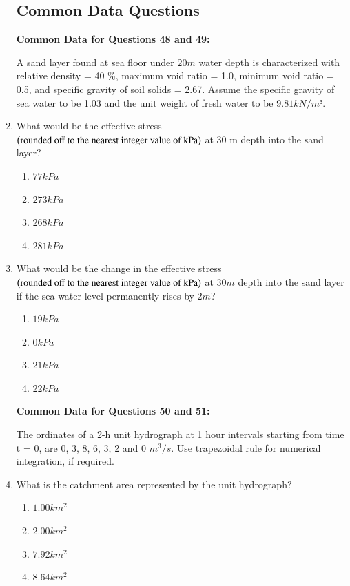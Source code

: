 \documentclass[journal,12pt,onecolumn]{IEEEtran}
\theoremstyle{remark}
\begin{document}
\begin{enumerate}
\subsection*{Common Data Questions}
\textbf{Common Data for Questions 48 and 49:}

A sand layer found at sea floor under $20 m$ water depth is characterized with relative density = 40 \%, maximum void ratio = 1.0, minimum void ratio = 0.5, and specific gravity of soil solids = 2.67. Assume the specific gravity of sea water to be 1.03 and the unit weight of fresh water to be $9.81 kN/m³$.

\item What would be the effective stress $\left(\text{rounded off to the nearest integer value of kPa}\right)$ at 30 m depth into the sand layer?

\hfill{}
\begin{enumerate}
\item $77kPa$
\item $273kPa$
\item $268kPa$
\item $281kPa$
\end{enumerate}

\item What would be the change in the effective stress $\left(\text{rounded off to the nearest integer value of kPa}\right)$ at $30 m$ depth into the sand layer if the sea water level permanently rises by $2 m$?

\hfill{}
\begin{enumerate}
\item $19kPa$
\item $0kPa$
\item $21kPa$
\item $22kPa$
\end{enumerate}

\textbf{Common Data for Questions 50 and 51:}

The ordinates of a 2-h unit hydrograph at 1 hour intervals starting from time t = 0, are 0, 3, 8, 6, 3, 2 and 0 $m^3/s$. Use trapezoidal rule for numerical integration, if required.

\item What is the catchment area represented by the unit hydrograph?

\hfill{}
\begin{enumerate}
\item $1.00km^2$
\item $2.00km^2$
\item $7.92km^2$
\item $8.64km^2$
\end{enumerate}


\end{enumerate}
\end{document}
